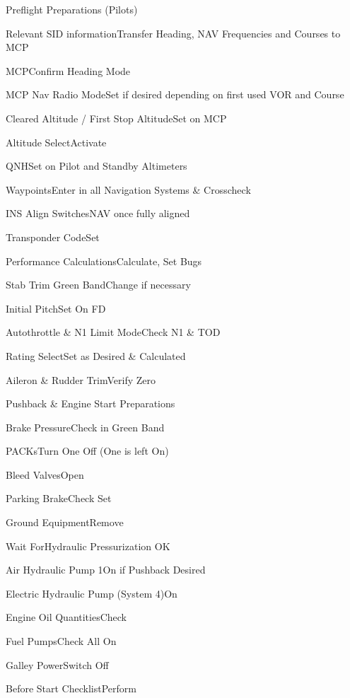 \documentclass[sim-use, blue_items]{checklist}
\begin{document}
\begin{checklist}{Preflight Preparations (Pilots)}
	\item{Relevant SID information}{Transfer Heading, NAV Frequencies and Courses to MCP}
	\item{MCP}{Confirm Heading Mode}
	\item{MCP Nav Radio Mode}{Set if desired depending on first used VOR and Course}
	\item{Cleared Altitude / First Stop Altitude}{Set on MCP}
	\item{Altitude Select}{Activate}
	\item{QNH}{Set on Pilot and Standby Altimeters}
	\item{Waypoints}{Enter in all Navigation Systems \& Crosscheck}
	\item{INS Align Switches}{NAV once fully aligned}
	\item{Transponder Code}{Set}
	\item{Performance Calculations}{Calculate, Set Bugs}
	\item{Stab Trim Green Band}{Change if necessary}
	\item{Initial Pitch}{Set On FD}
	\item{Autothrottle \& N1 Limit Mode}{Check N1 \& TOD}
	\item{Rating Select}{Set as Desired \& Calculated}
	\item{Aileron \& Rudder Trim}{Verify Zero}
\end{checklist}

\begin{checklist}{Pushback \& Engine Start Preparations}
	\item{Brake Pressure}{Check in Green Band}
	\item{PACKs}{Turn One Off (One is left On)}
	\item{Bleed Valves}{Open}
	\item{Parking Brake}{Check Set}
	\item{Ground Equipment}{Remove}
	 {
		\item{Wait For}{Hydraulic Pressurization OK}
		\item{Air Hydraulic Pump 1}{On if Pushback Desired}
		\item{Electric Hydraulic Pump (System 4)}{On}
	}
	\item{Engine Oil Quantities}{Check}
	\item{Fuel Pumps}{Check All On}
	\item{Galley Power}{Switch Off}
	\item{Before Start Checklist}{Perform}
\end{checklist}
\end{document}
